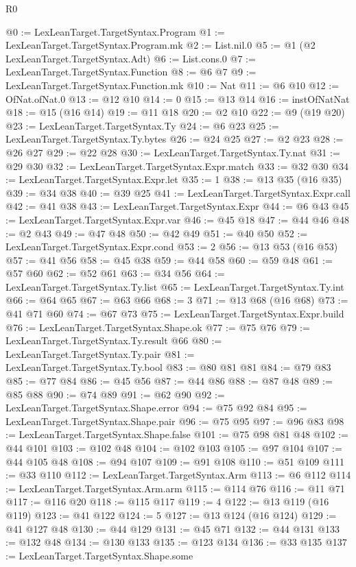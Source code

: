 \begin{lexlean}{R0}
\begin{coremodule}
{{{{{{{{{{{{{{{{{{{{{{{{{{{{{{{{{{{{{{{{{{{{{{{{{{{{{{{{{{{{{{{{{{{{{{{{{@0 := LexLeanTarget.TargetSyntax.Program
@1 := LexLeanTarget.TargetSyntax.Program.mk
@2 := List.nil.{0}
@5 := @1 (@2 LexLeanTarget.TargetSyntax.Adt)
@6 := List.cons.{0}
@7 := LexLeanTarget.TargetSyntax.Function
@8 := @6 @7
@9 := LexLeanTarget.TargetSyntax.Function.mk
@10 := Nat
@11 := @6 @10
@12 := OfNat.ofNat.{0}
@13 := @12 @10
@14 := 0
@15 := @13 @14
@16 := instOfNatNat
@18 := @15 (@16 @14)
@19 := @11 @18
@20 := @2 @10
@22 := @9 (@19 @20)
@23 := LexLeanTarget.TargetSyntax.Ty
@24 := @6 @23
@25 := LexLeanTarget.TargetSyntax.Ty.bytes
@26 := @24 @25
@27 := @2 @23
@28 := @26 @27
@29 := @22 @28
@30 := LexLeanTarget.TargetSyntax.Ty.nat
@31 := @29 @30
@32 := LexLeanTarget.TargetSyntax.Expr.match
@33 := @32 @30
@34 := LexLeanTarget.TargetSyntax.Expr.let
@35 := 1
@38 := @13 @35 (@16 @35)
@39 := @34 @38
@40 := @39 @25
@41 := LexLeanTarget.TargetSyntax.Expr.call
@42 := @41 @38
@43 := LexLeanTarget.TargetSyntax.Expr
@44 := @6 @43
@45 := LexLeanTarget.TargetSyntax.Expr.var
@46 := @45 @18
@47 := @44 @46
@48 := @2 @43
@49 := @47 @48
@50 := @42 @49
@51 := @40 @50
@52 := LexLeanTarget.TargetSyntax.Expr.cond
@53 := 2
@56 := @13 @53 (@16 @53)
@57 := @41 @56
@58 := @45 @38
@59 := @44 @58
@60 := @59 @48
@61 := @57 @60
@62 := @52 @61
@63 := @34 @56
@64 := LexLeanTarget.TargetSyntax.Ty.list
@65 := LexLeanTarget.TargetSyntax.Ty.int
@66 := @64 @65
@67 := @63 @66
@68 := 3
@71 := @13 @68 (@16 @68)
@73 := @41 @71 @60
@74 := @67 @73
@75 := LexLeanTarget.TargetSyntax.Expr.build
@76 := LexLeanTarget.TargetSyntax.Shape.ok
@77 := @75 @76
@79 := LexLeanTarget.TargetSyntax.Ty.result @66
@80 := LexLeanTarget.TargetSyntax.Ty.pair
@81 := LexLeanTarget.TargetSyntax.Ty.bool
@83 := @80 @81 @81
@84 := @79 @83
@85 := @77 @84
@86 := @45 @56
@87 := @44 @86
@88 := @87 @48
@89 := @85 @88
@90 := @74 @89
@91 := @62 @90
@92 := LexLeanTarget.TargetSyntax.Shape.error
@94 := @75 @92 @84
@95 := LexLeanTarget.TargetSyntax.Shape.pair
@96 := @75 @95
@97 := @96 @83
@98 := LexLeanTarget.TargetSyntax.Shape.false
@101 := @75 @98 @81 @48
@102 := @44 @101
@103 := @102 @48
@104 := @102 @103
@105 := @97 @104
@107 := @44 @105 @48
@108 := @94 @107
@109 := @91 @108
@110 := @51 @109
@111 := @33 @110
@112 := LexLeanTarget.TargetSyntax.Arm
@113 := @6 @112
@114 := LexLeanTarget.TargetSyntax.Arm.arm
@115 := @114 @76
@116 := @11 @71
@117 := @116 @20
@118 := @115 @117
@119 := 4
@122 := @13 @119 (@16 @119)
@123 := @41 @122
@124 := 5
@127 := @13 @124 (@16 @124)
@129 := @41 @127 @48
@130 := @44 @129
@131 := @45 @71
@132 := @44 @131
@133 := @132 @48
@134 := @130 @133
@135 := @123 @134
@136 := @33 @135
@137 := LexLeanTarget.TargetSyntax.Shape.some
}}}}}}}}}}}}}}}}}}}}}}}}}}}}}}}}}}}}}}}}}}}}}}}}}}}}}}}}}}}}}}}}}}}}}}}}}
\end{coremodule}
\end{lexlean}
